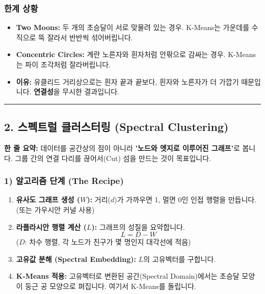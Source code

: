 \documentclass[11pt,a4paper]{book}
\theoremstyle{definition}
\begin{document}
\subsubsection*{한계 상황}
\begin{itemize}
    \item \textbf{Two Moons:} 두 개의 초승달이 서로 맞물려 있는 경우. K-Means는 가운데를 수직으로 뚝 잘라서 반반씩 섞어버립니다.
    \item \textbf{Concentric Circles:} 계란 노른자와 흰자처럼 안팎으로 감싸는 경우. K-Means는 파이 조각처럼 잘라버립니다.
    \item \textbf{이유:} 유클리드 거리상으로는 흰자 끝과 끝보다, 흰자와 노른자가 더 가깝기 때문입니다. \textbf{연결성}을 무시한 결과입니다.
\end{itemize}

\vspace{0.5cm}\hrule\vspace{0.5cm}

\subsection{2. 스펙트럴 클러스터링 (Spectral Clustering)}

\begin{conceptbox}[title={개념 2: 다리 끊기 (Graph Cut)}]
\textbf{한 줄 요약:} 데이터를 공간상의 점이 아니라 \textbf{'노드와 엣지로 이루어진 그래프'}로 봅니다. 그룹 간의 연결 다리를 끊어서(Cut) 섬을 만드는 것이 목표입니다.
\end{conceptbox}

\subsubsection*{1) 알고리즘 단계 (The Recipe)}
\begin{enumerate}
    \item \textbf{유사도 그래프 생성 ($W$):} 거리($d$)가 가까우면 1, 멀면 0인 인접 행렬을 만듭니다. (또는 가우시안 커널 사용)
    \item \textbf{라플라시안 행렬 계산 ($L$):} 그래프의 성질을 요약합니다.
    $$ L = D - W $$
    ($D$: 차수 행렬, 각 노드가 친구가 몇 명인지 대각선에 적음)
    \item \textbf{고유값 분해 (Spectral Embedding):} $L$의 고유벡터를 구합니다.
    \item \textbf{K-Means 적용:} 고유벡터로 변환된 공간(Spectral Domain)에서는 초승달 모양이 둥근 공 모양으로 펴집니다. 여기서 K-Means를 돌립니다.
\end{enumerate}
\end{document}
